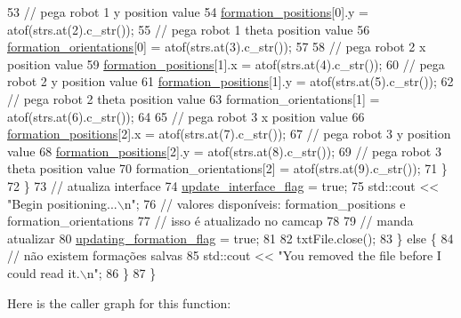 \begin{DoxyCode}
53                 \textcolor{comment}{// pega robot 1 y position value}
54                 \hyperlink{class_strategy_g_u_i_a4d2d15fe0a25b8d9d8fa56a4cf155ff0}{formation\_positions}[0].y = atof(strs.at(2).c\_str());
55                 \textcolor{comment}{// pega robot 1 theta position value}
56                 \hyperlink{class_strategy_g_u_i_ad8d7e6bbfceba5d6284c8825f37ea8a2}{formation\_orientations}[0] = atof(strs.at(3).c\_str());
57 
58                 \textcolor{comment}{// pega robot 2 x position value}
59                 \hyperlink{class_strategy_g_u_i_a4d2d15fe0a25b8d9d8fa56a4cf155ff0}{formation\_positions}[1].x = atof(strs.at(4).c\_str());
60                 \textcolor{comment}{// pega robot 2 y position value}
61                 \hyperlink{class_strategy_g_u_i_a4d2d15fe0a25b8d9d8fa56a4cf155ff0}{formation\_positions}[1].y = atof(strs.at(5).c\_str());
62                 \textcolor{comment}{// pega robot 2 theta position value}
63                 formation\_orientations[1] = atof(strs.at(6).c\_str());
64 
65                 \textcolor{comment}{// pega robot 3 x position value}
66                 \hyperlink{class_strategy_g_u_i_a4d2d15fe0a25b8d9d8fa56a4cf155ff0}{formation\_positions}[2].x = atof(strs.at(7).c\_str());
67                 \textcolor{comment}{// pega robot 3 y position value}
68                 \hyperlink{class_strategy_g_u_i_a4d2d15fe0a25b8d9d8fa56a4cf155ff0}{formation\_positions}[2].y = atof(strs.at(8).c\_str());
69                 \textcolor{comment}{// pega robot 3 theta position value}
70                 formation\_orientations[2] = atof(strs.at(9).c\_str());
71             \}
72         \}
73         \textcolor{comment}{// atualiza interface}
74         \hyperlink{class_strategy_g_u_i_a83d19a6d98510e3984be7196c740d1fc}{update\_interface\_flag} = \textcolor{keyword}{true};
75         std::cout << \textcolor{stringliteral}{"Begin positioning...\(\backslash\)n"};
76         \textcolor{comment}{// valores disponíveis: formation\_positions e formation\_orientations}
77         \textcolor{comment}{// isso é atualizado no camcap}
78 
79         \textcolor{comment}{// manda atualizar}
80         \hyperlink{class_strategy_g_u_i_a46f3c766dd61236382cc2681372f6538}{updating\_formation\_flag} = \textcolor{keyword}{true};
81 
82         txtFile.close();
83     \} \textcolor{keywordflow}{else} \{
84         \textcolor{comment}{// não existem formações salvas}
85         std::cout << \textcolor{stringliteral}{"You removed the file before I could read it.\(\backslash\)n"};
86     \}
87 \}
\end{DoxyCode}
Here is the caller graph for this function\+:
\mbox{\label{class_strategy_g_u_i_a21327fb17108edba191fa216ec73aafd}} 
